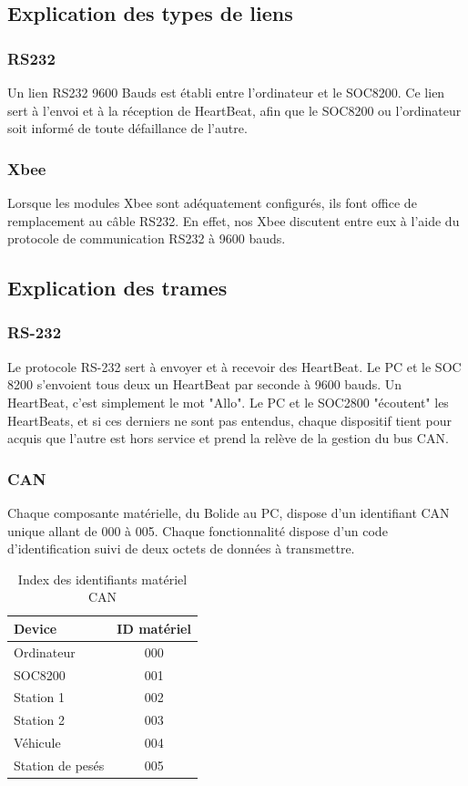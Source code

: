 \documentclass[10pt,a4paper,final]{article}
\begin{document}
\begin{spacing}{1.5}
\subsection{Explication des types de liens}

\subsubsection{RS232}
Un lien RS232 9600 Bauds est établi entre l'ordinateur et le SOC8200. Ce lien sert à l'envoi et à la réception de HeartBeat, afin que le SOC8200 ou l'ordinateur soit informé de toute défaillance de l'autre.

\subsubsection{Xbee}
Lorsque les modules Xbee sont adéquatement configurés, ils font office de remplacement au câble RS232. En effet, nos Xbee discutent entre eux à l'aide du protocole de communication RS232 à 9600 bauds.  

\subsection{Explication des trames}

\subsubsection{RS-232}
Le protocole RS-232 sert à envoyer et à recevoir des HeartBeat. Le PC et le SOC 8200 s'envoient tous deux un HeartBeat par seconde à 9600 bauds. Un HeartBeat, c'est simplement le mot "Allo". Le PC et le SOC2800 "écoutent" les HeartBeats, et si ces derniers ne sont pas entendus, chaque dispositif tient pour acquis que l'autre est hors service et prend la relève de la gestion du bus CAN.\pagebreak

\subsubsection{CAN}
Chaque composante matérielle, du Bolide au PC, dispose d'un identifiant CAN unique allant de 000 à 005. Chaque fonctionnalité dispose d'un code d'identification suivi de deux octets de données à transmettre.

\begin{table}[!ht]
\caption{Index des identifiants matériel CAN}
\medskip
\centering
\begin{tabular}{|l|c|}
\hline 
\textbf{Device} & \textbf{ID matériel} \\ 
\hline 
Ordinateur & 000 \\ 
\hline 
SOC8200 & 001 \\ 
\hline 
Station 1 & 002 \\ 
\hline 
Station 2  & 003 \\ 
\hline
Véhicule & 004 \\
\hline 
Station de pesés  & 005 \\ 
\hline 
\end{tabular} 
\label{tab:testtab1}
\end{table} 



\end{spacing}
\end{document}
